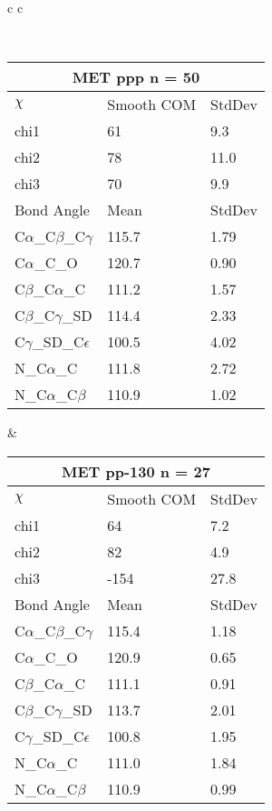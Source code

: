 \begin{longtable}{ c c }

\caption{MET Central Values}\\
  \begin{tabular}{ l l l }
  \toprule
  \multicolumn{3}{c}{MET \textbf{ppp} n = 50} \\ \toprule
  $\chi$       & Smooth COM & StdDev \\ \midrule
  chi1 & 61 & 9.3 \\ 
  chi2 & 78 & 11.0 \\ 
  chi3 & 70 & 9.9 \\ \midrule
  Bond Angle   & Mean     & StdDev \\ \midrule
  C$\alpha$\_C$\beta$\_C$\gamma$ & 115.7 & 1.79\\
  C$\alpha$\_C\_O & 120.7 & 0.90\\
  C$\beta$\_C$\alpha$\_C & 111.2 & 1.57\\
  C$\beta$\_C$\gamma$\_SD & 114.4 & 2.33\\
  C$\gamma$\_SD\_C$\epsilon$ & 100.5 & 4.02\\
  N\_C$\alpha$\_C & 111.8 & 2.72\\
  N\_C$\alpha$\_C$\beta$ & 110.9 & 1.02\\
  \bottomrule
  \end{tabular}
  &
  \begin{tabular}{ l l l }
  \toprule
  \multicolumn{3}{c}{MET \textbf{pp-130} n = 27} \\ \toprule
  $\chi$       & Smooth COM & StdDev \\ \midrule
  chi1 & 64 & 7.2 \\ 
  chi2 & 82 & 4.9 \\ 
  chi3 & -154 & 27.8 \\ \midrule
  Bond Angle   & Mean     & StdDev \\ \midrule
  C$\alpha$\_C$\beta$\_C$\gamma$ & 115.4 & 1.18\\
  C$\alpha$\_C\_O & 120.9 & 0.65\\
  C$\beta$\_C$\alpha$\_C & 111.1 & 0.91\\
  C$\beta$\_C$\gamma$\_SD & 113.7 & 2.01\\
  C$\gamma$\_SD\_C$\epsilon$ & 100.8 & 1.95\\
  N\_C$\alpha$\_C & 111.0 & 1.84\\
  N\_C$\alpha$\_C$\beta$ & 110.9 & 0.99\\
  \bottomrule
  \end{tabular}
  \\

\end{longtable}
